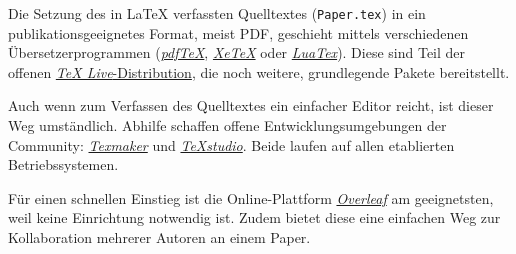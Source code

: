 Die Setzung des in \LaTeX{} verfassten Quelltextes (\texttt{Paper.tex}) in ein pub\-li\-ka\-tions\-geeignetes Format, meist PDF, geschieht mittels verschiedenen Übersetzerprogrammen (\href{http://www.pdftex.org/}{\emph{pdfTeX}}, \href{http://xetex.sourceforge.net/}{\emph{XeTeX}} oder \href{http://www.luatex.org/}{\emph{LuaTex}}).
Diese sind Teil der offenen \href{https://tug.org/texlive/}{\emph{\TeX{} Live}-Distribution}, die noch weitere, grundlegende Pakete bereitstellt.
\vspace{0.5em}

Auch wenn zum Verfassen des Quelltextes ein einfacher Editor reicht, ist dieser Weg umständlich.
Abhilfe schaffen offene Entwicklungsumgebungen der Community: \href{https://www.xm1math.net/texmaker/}{\emph{Texmaker}} und \href{https://www.texstudio.org/}{\emph{TeXstudio}}.
Beide laufen auf allen etablierten Betriebssystemen.
\vspace{0.5em}

Für einen schnellen Einstieg ist die Online-Plattform \href{https://www.overleaf.com}{\emph{ Overleaf}} am geeignetsten, weil keine Einrichtung notwendig ist.
Zudem bietet diese eine einfachen Weg zur Kollaboration mehrerer Autoren an einem Paper.
